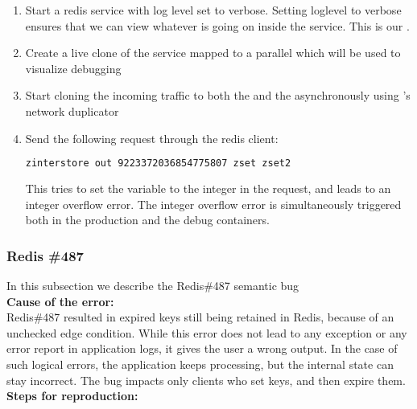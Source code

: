 \begin{adjustwidth}{0.5cm}{}
\begin{enumerate}
	\item Start a redis service with log level set to verbose. Setting loglevel to verbose ensures that we can view whatever is going on inside the service. This is our \productioncontainer.
	\item Create a live clone of the service mapped to a parallel \debugcontainer which will be used to visualize debugging
	\item Start cloning the incoming traffic to both the \productioncontainer and the \debugcontainer asynchronously using \parikshan's network duplicator
	\item Send the following request through the redis client: 
	
		\begin{lstlisting}[language=sh]
		zinterstore out 9223372036854775807 zset zset2
		\end{lstlisting}
		
		This tries to set the variable to the integer in the request, and leads to an integer overflow error. The integer overflow error is simultaneously triggered both in the production and the debug containers.
	
\end{enumerate}
\end{adjustwidth}

\subsubsection{Redis \#487}

In this subsection we describe the Redis\#487 semantic bug \\

\noindent \textbf{Cause of the error:} \\

Redis\#487 resulted in expired keys still being retained in Redis, because of an unchecked edge condition.
While this error does not lead to any exception or any error report in application logs, it gives the user a wrong output.
In the case of such logical errors, the application keeps processing, but the internal state can stay incorrect.
The bug impacts only clients who set keys, and then expire them.\\

\noindent \textbf{Steps for reproduction:} \\

